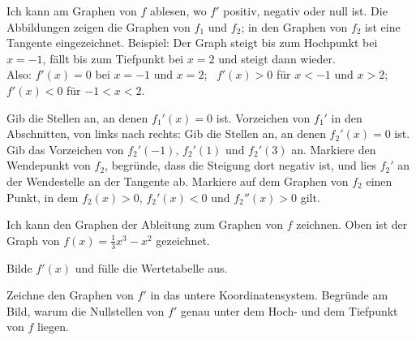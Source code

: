 \setcounter{aufgabe}{30}
\hypertarget{e4}{}

\begin{aufgabe}{Ich kann am Graphen von $f$ ablesen, wo $f'$ positiv, negativ oder null ist. Die Abbildungen zeigen die Graphen von $f_1$ und $f_2$; in den Graphen von $f_2$ ist eine Tangente eingezeichnet.}
Beispiel: Der Graph steigt bis zum Hochpunkt bei $x = -1$, fällt bis zum Tiefpunkt bei $x = 2$ und steigt dann wieder. \\
Also: $f'(x) = 0$ bei $x = -1$ und $x = 2$; \ $f'(x) > 0$ für $x < -1$ und $x > 2$; \ $f'(x) < 0$ für $-1 < x < 2$.

\begin{ksys}[xmin=-3,xmax=4,ymin=-3,ymax=4,ablesen]
\end{ksys}\ksysabstand\begin{ksys}[xmin=-2,xmax=4,ymin=-3,ymax=5,ablesen]
\end{ksys}

\begin{teile}
\teil Gib die Stellen an, an denen $f_1'(x) = 0$ ist. \leerfeld
\teil Vorzeichen von $f_1'$ in den Abschnitten, von links nach rechts: \leerfeld
\teil Gib die Stellen an, an denen $f_2'(x) = 0$ ist. \leerfeld
\teil Gib das Vorzeichen von $f_2'(-1)$, $f_2'(1)$ und $f_2'(3)$ an. \leerfeld
\teil Markiere den Wendepunkt von $f_2$, begründe, dass die Steigung dort negativ ist, und lies $f_2'$ an der Wendestelle an der Tangente ab.
\teil Markiere auf dem Graphen von $f_2$ einen Punkt, in dem $f_2(x) > 0$, $f_2'(x) < 0$ und $f_2''(x) > 0$ gilt.
\end{teile}
\end{aufgabe}

\begin{aufgabe}{Ich kann den Graphen der Ableitung zum Graphen von $f$ zeichnen. Oben ist der Graph von $f(x) = \frac{1}{3}x^3 - x^2$ gezeichnet.}
\begin{teile}
\teil Bilde $f'(x)$ und fülle die Wertetabelle aus.
\end{teile}


\begin{teile}
\teil Zeichne den Graphen von $f'$ in das untere Koordinatensystem.
\teil Begründe am Bild, warum die Nullstellen von $f'$ genau unter dem Hoch- und dem Tiefpunkt von $f$ liegen.
\end{teile}
\end{aufgabe}

